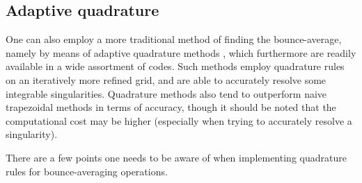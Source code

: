 \subsection{Adaptive quadrature} \label{sec:adaptive_quad}
One can also employ a more traditional method of finding the bounce-average, namely by means of adaptive quadrature methods \cite{calvetti2000computation,gander2000adaptive,gonnet2012review}, which furthermore are readily available in a wide assortment of codes. Such methods employ quadrature rules on an iteratively more refined grid, and are able to accurately resolve some integrable singularities. Quadrature methods also tend to outperform naive trapezoidal methods in terms of accuracy, though it should be noted that the computational cost may be higher (especially when trying to accurately resolve a singularity). \par 
There are a few points one needs to be aware of when implementing quadrature rules for bounce-averaging operations. 
